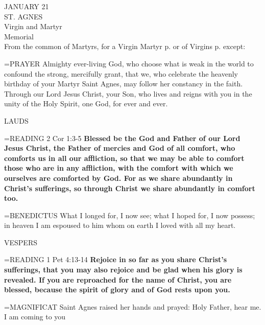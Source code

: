 \begin{center}\normalsize JANUARY 21\\
\footnotesize ST. AGNES\\
\footnotesize Virgin and Martyr\\
\footnotesize Memorial\\
\footnotesize From the common of Martyrs, for a Virgin Martyr p.   or of Virgins p.   except:\\
\end{center}

\hangindent=\parindent \small{PRAYER 
Almighty ever-living God,
who choose what is weak in the world to confound the strong,
mercifully grant,
that we, who celebrate the heavenly birthday of your Martyr Saint Agnes,
may follow her constancy in the faith.
Through our Lord Jesus Christ, your Son,
who lives and reigns with you in the unity of the Holy Spirit,
one God, for ever and ever.\\}
 
\begin{flushleft}\normalsize LAUDS\\\end{flushleft}

\hangindent=\parindent \small{READING} 2 Cor 1:3-5 \textbf{Blessed be the God and Father of our Lord Jesus
Christ, the Father of mercies and God of all comfort, who comforts
us in all our affliction, so that we may be able to comfort those who
are in any affliction, with the comfort with which we ourselves are
comforted by God. For as we share abundantly in Christ’s sufferings,
so through Christ we share abundantly in comfort too.\\}
 
\hangindent=\parindent \small{BENEDICTUS  What I longed for, I now see; what I hoped for, I now
possess; in heaven I am espoused to him whom on earth I loved with
all my heart.\\}
 
\begin{flushleft}\normalsize VESPERS\\\end{flushleft}

\hangindent=\parindent \small{READING} 1 Pet 4:13-14 \textbf{Rejoice in so far as you share Christ’s sufferings,
that you may also rejoice and be glad when his glory is revealed. If
you are reproached for the name of Christ, you are blessed, because
the spirit of glory and of God rests upon you.\\}
 
\hangindent=\parindent \small{MAGNIFICAT  Saint Agnes raised her hands and prayed: Holy Father,
hear me. I am coming to you\\}
 
 

